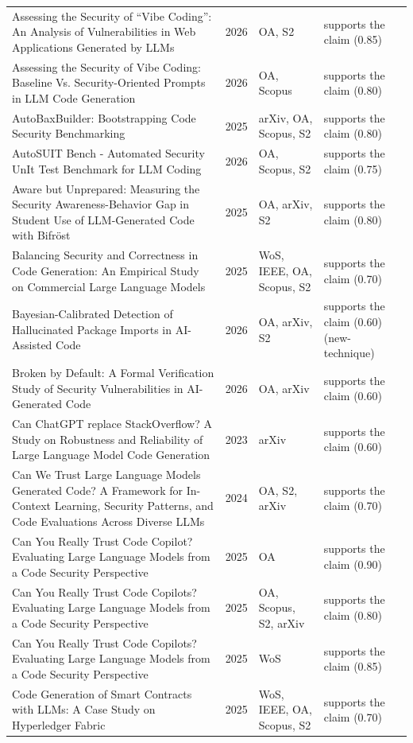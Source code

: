 \begin{longtable}{@{}%
  >{\raggedright\arraybackslash}p{}c%
  >{\raggedright\arraybackslash}p{}%
  >{\raggedright\arraybackslash}p{}@{}}
Assessing the Security of ``Vibe Coding'': An Analysis of Vulnerabilities in Web Applications Generated by LLMs & 2026 & OA, S2 & supports the claim (0.85) \\
Assessing the Security of Vibe Coding: Baseline Vs. Security-Oriented Prompts in LLM Code Generation & 2026 & OA, Scopus & supports the claim (0.80) \\
AutoBaxBuilder: Bootstrapping Code Security Benchmarking & 2025 & arXiv, OA, Scopus, S2 & supports the claim (0.80) \\
AutoSUIT Bench - Automated Security UnIt Test Benchmark for LLM Coding & 2026 & OA, Scopus, S2 & supports the claim (0.75) \\
Aware but Unprepared: Measuring the Security Awareness-Behavior Gap in Student Use of LLM-Generated Code with Bifröst & 2025 & OA, arXiv, S2 & supports the claim (0.80) \\
Balancing Security and Correctness in Code Generation: An Empirical Study on Commercial Large Language Models & 2025 & WoS, IEEE, OA, Scopus, S2 & supports the claim (0.70) \\
Bayesian-Calibrated Detection of Hallucinated Package Imports in AI-Assisted Code & 2026 & OA, arXiv, S2 & supports the claim (0.60) (new-technique) \\
Broken by Default: A Formal Verification Study of Security Vulnerabilities in AI-Generated Code & 2026 & OA, arXiv & supports the claim (0.60) \\
Can ChatGPT replace StackOverflow? A Study on Robustness and Reliability of Large Language Model Code Generation & 2023 & arXiv & supports the claim (0.60) \\
Can We Trust Large Language Models Generated Code? A Framework for In-Context Learning, Security Patterns, and Code Evaluations Across Diverse LLMs & 2024 & OA, S2, arXiv & supports the claim (0.70) \\
Can You Really Trust Code Copilot? Evaluating Large Language Models from a Code Security Perspective & 2025 & OA & supports the claim (0.90) \\
Can You Really Trust Code Copilots? Evaluating Large Language Models from a Code Security Perspective & 2025 & OA, Scopus, S2, arXiv & supports the claim (0.80) \\
Can You Really Trust Code Copilots? Evaluating Large Language Models from a Code Security Perspective & 2025 & WoS & supports the claim (0.85) \\
Code Generation of Smart Contracts with LLMs: A Case Study on Hyperledger Fabric & 2025 & WoS, IEEE, OA, Scopus, S2 & supports the claim (0.70) \\

\end{longtable}
